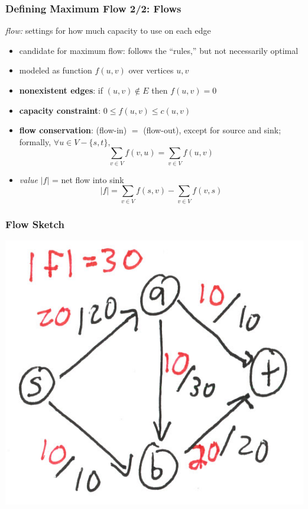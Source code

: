 \documentclass{beamer}
\begin{document}
\begin{frame} \frametitle{Defining Maximum Flow 2/2: Flows}
\emph{flow:} settings for how much capacity to use on each edge
\begin{itemize}
  \item candidate for maximum flow: follows the ``rules,'' but not necessarily
    optimal
  \item modeled as function $f(u, v)$ over vertices $u, v$
  \item \textbf{nonexistent edges}: if $(u, v) \notin E$ then $f(u, v) = 0$
  \item \textbf{capacity constraint}: $0 \leq f(u, v) \leq c(u, v)$
  \item \textbf{flow conservation}: (flow-in) $=$ (flow-out), except for source and
    sink; formally, $\forall u \in V - \{s, t\},$
    \[ \sum_{v \in V} f(v, u) = \sum_{v \in V} f(u, v) \]
  \item \emph{value} $|f|$ = net flow into sink
    \[ |f| = \sum_{v \in V} f(s, v) - \sum_{v \in V} f(v, s) \]
\end{itemize}
\end{frame}

\begin{frame} \frametitle{Flow Sketch}
\begin{center}
  \includegraphics{flow-example.png}
\end{center}
\end{frame}
\end{document}
